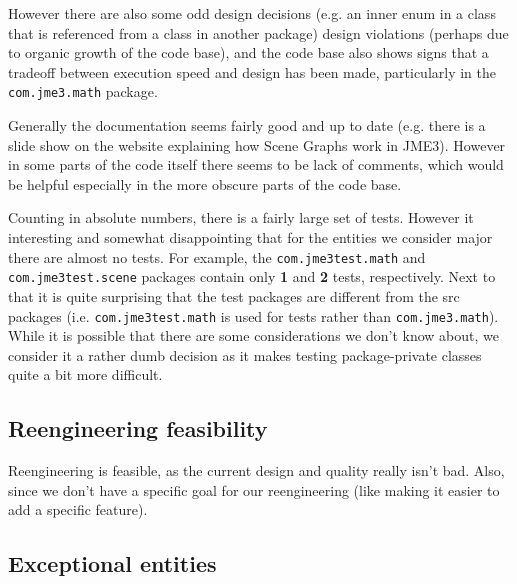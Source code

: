 \documentclass[a4paper, 10pt]{article}
\begin{document}
However there are also some odd design decisions (e.g. an inner enum in a
class that is referenced from a class in another package) design
violations (perhaps due to organic growth of the code base), and the
code base also shows signs that a tradeoff between execution speed and
design has been made, particularly in the \verb|com.jme3.math| package.

Generally the documentation seems fairly good and up to date
(e.g. there is a slide show on the website explaining how Scene Graphs
work in JME3). However in some parts of the code itself there seems to
be lack of comments, which would be helpful especially in the more
obscure parts of the code base.

Counting in absolute numbers, there is a fairly large set of tests.
However it interesting and somewhat disappointing that for the
entities we consider major there are almost no tests. For example,
the \verb|com.jme3test.math| and \verb|com.jme3test.scene| packages
contain only \textbf{1} and \textbf{2} tests, respectively.
Next to that it is quite surprising that the test packages are
different from the src packages (i.e. \verb|com.jme3test.math| is used
for tests rather than \verb|com.jme3.math|). While it is possible that
there are some considerations we don't know about, we consider it a
rather dumb decision as it makes testing package-private classes quite
a bit more difficult.


\subsection{Reengineering feasibility}
\label{sec:reengineering_feasibility}
Reengineering is feasible, as the current design and quality really isn't bad.
Also, since we don't have a specific goal for our reengineering 
(like making it easier to add a specific feature).



\subsection{Exceptional entities}
\label{sec:exceptional_entities}
\end{document}
